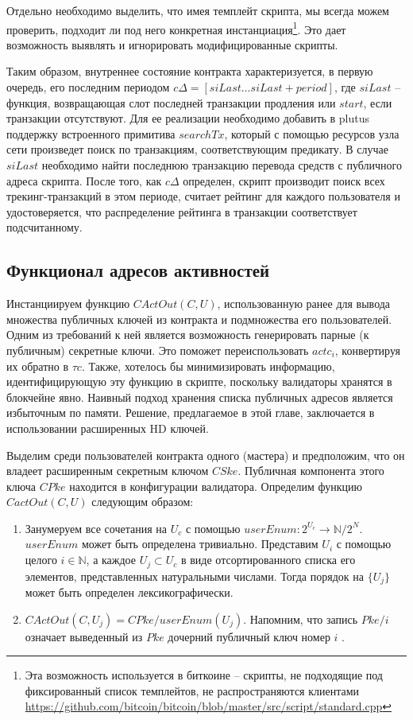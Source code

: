 \documentclass[specification,annotation]{itmo-student-thesis}
\begin{document}
Отдельно необходимо выделить, что имея темплейт скрипта, мы всегда
можем проверить, подходит ли под него конкретная
инстанциация\footnote{Эта возможность используется в биткоине --
  скрипты, не подходящие под фиксированный список темплейтов, не
  распространяются клиентами
  \url{https://github.com/bitcoin/bitcoin/blob/master/src/script/standard.cpp}}. Это
дает возможность выявлять и игнорировать модифицированные скрипты.

Таким образом, внутреннее состояние контракта характеризуется, в
первую очередь, его последним периодом $c\Delta = [siLast \ldots
siLast+period]$, где $siLast$ -- функция, возвращающая слот
последней транзакции продления или $start$, если транзакции
отсутствуют. Для ее реализации необходимо добавить в plutus поддержку
встроенного примитива $searchTx$, который с помощью ресурсов узла сети
произведет поиск по транзакциям, соответствующим предикату. В случае
$siLast$ необходимо найти последнюю транзакцию перевода средств с
публичного адреса скрипта. После того, как $c\Delta$ определен, скрипт
производит поиск всех трекинг-транзакций в этом периоде, считает
рейтинг для каждого пользователя и удостоверяется, что распределение
рейтинга в транзакции соответствует подсчитанному.

\subsection{Функционал адресов активностей}

Инстанциируем функцию $CActOut(C, U)$, использованную ранее для вывода
множества публичных ключей из контракта и подмножества его
пользователей. Одним из требований к ней является возможность
генерировать парные (к публичным) секретные ключи. Это поможет
переиспользовать $actc_i$, конвертируя их обратно в $\tau c$. Также,
хотелось бы минимизировать информацию, идентифицирующую эту функцию в
скрипте, поскольку валидаторы хранятся в блокчейне явно. Наивный
подход хранения списка публичных адресов является избыточным по
памяти. Решение, предлагаемое в этой главе, заключается в
использовании расширенных HD ключей.

Выделим среди пользователей контракта одного (мастера) и предположим,
что он владеет расширенным секретным ключом $CSke$. Публичная
компонента этого ключа $CPke$ находится в конфигурации
валидатора. Определим функцию $CactOut(C,U)$ следующим образом:

\begin{enumerate}
\item Занумеруем все сочетания на $U_c$ с помощью $userEnum : 2^{U_c}
  \rightarrow \mathbb{N} / 2^N$. $userEnum$ может быть определена
  тривиально. Представим $U_i$ с помощью целого $i \in \mathbb{N}$, а
  каждое $U_j \subset U_c$ в виде отсортированного списка его
  элементов, представленных натуральными числами. Тогда порядок на
  $\{U_j\}$ может быть определен лексикографически.
\item $CActOut(C,U_j) = CPke/userEnum(U_j)$. Напомним, что запись
  $Pke/i$ означает выведенный из $Pke$ дочерний публичный ключ номер
  $i$ .
\end{enumerate}
\end{document}
